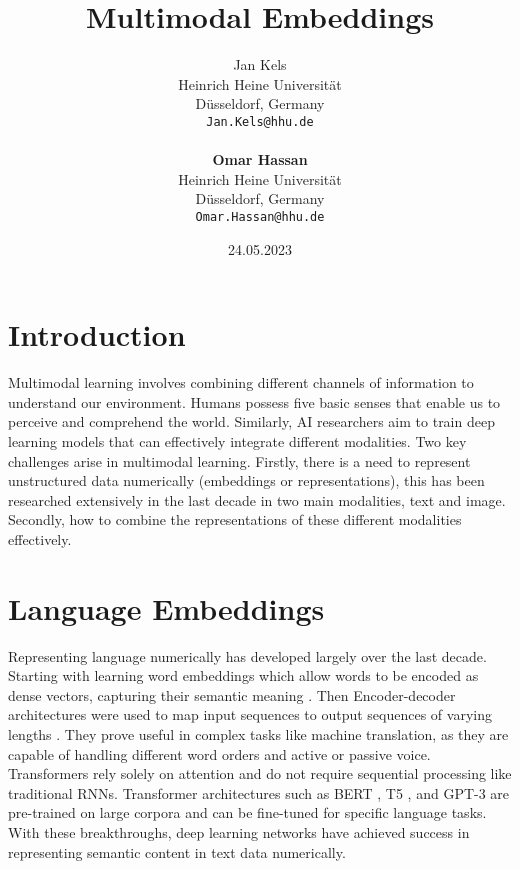 \documentclass[11pt,a4paper]{article}
\title{Multimodal Embeddings}
\author{Jan Kels \\
  Heinrich Heine Universität \\
  Düsseldorf, Germany \\
  \texttt{Jan.Kels@hhu.de} \\ \\
  \textbf{Omar Hassan}\\
  Heinrich Heine Universität \\
  Düsseldorf, Germany \\
  \texttt{Omar.Hassan@hhu.de}
  }
\date{24.05.2023}
\begin{document}
\maketitle


\section{Introduction} %
Multimodal learning involves combining different channels of information to understand our environment. Humans possess five basic senses that enable us to perceive and comprehend the world. Similarly, AI researchers aim to train deep learning models that can effectively integrate different modalities. Two key challenges arise in multimodal learning. Firstly, there is a need to represent unstructured data numerically (embeddings or representations), this has been researched extensively in the last decade in two main modalities, text and image. Secondly, how to combine the representations of these different modalities effectively. \cite{akkus2023multimodal}

\section{Language Embeddings}
Representing language numerically has developed largely over the last decade. Starting with learning word embeddings which allow words to be encoded as dense vectors, capturing their semantic meaning \cite{mikolov2013efficient}. Then Encoder-decoder architectures were used to map input sequences to output sequences of varying lengths \cite{bahdanau2016neural}. They prove useful in complex tasks like machine translation, as they are capable of handling different word orders and active or passive voice.
Transformers \cite{vaswani2017attention} rely solely on attention and do not require sequential processing like traditional RNNs. Transformer architectures such as BERT \cite{devlin2019bert}, T5 \cite{raffel2020exploring}, and GPT-3 \cite{brown2020language} are pre-trained on large corpora and can be fine-tuned for specific language tasks. With these breakthroughs, deep learning networks have achieved success in representing semantic content in text data numerically.
\end{document}
